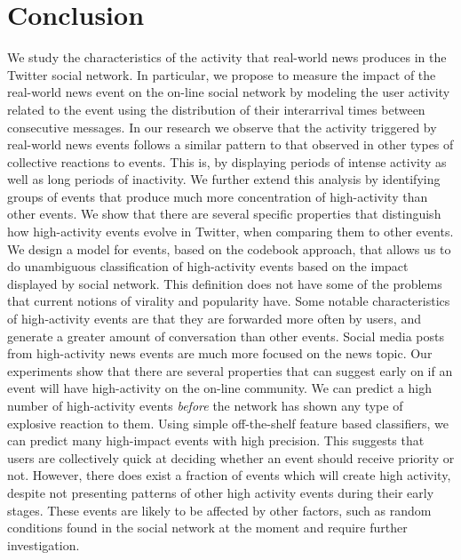 \section{Conclusion}

We study the characteristics of the activity that real-world news produces in
the Twitter social network. 
%
In particular, we propose to measure the impact of the real-world news event on
the on-line social network by modeling the user activity related to the event
using the distribution of their interarrival times between consecutive messages.
%
In our research we observe that the activity triggered by real-world news events
follows a similar pattern to that observed in other types of collective
reactions to events. 
%
This is, by displaying periods of intense activity as well as long periods of
inactivity.
%
We further extend this analysis by identifying groups of events that produce
much more concentration of high-activity than other events. 
%
We show that there are several specific properties that distinguish how
high-activity events evolve in Twitter, when comparing them to other events. 
%
We design a model for events, based on the codebook approach, that allows us to
do unambiguous classification of high-activity events based on the impact
displayed by social network. 
%
This definition does not have some of the problems that current notions of
virality and popularity have. 
%
Some notable characteristics of high-activity events are that they are forwarded
more often by users, and generate a greater amount of conversation than other
events.
%
Social media posts from high-activity news events are much more focused on the
news topic. 
%
Our experiments show that there are several properties that can suggest early on
if an event will have high-activity on the on-line community. 
%
We can predict a high number of high-activity events {\em before} the network
has shown any type of explosive reaction to them. 
%
Using simple off-the-shelf feature based classifiers, we can predict many
high-impact events with high precision. 
%
This suggests that users are collectively quick at deciding whether an event
should receive priority or not. 
%
However, there does exist a fraction of events which will create high activity,
despite not presenting patterns of other high activity events during their early
stages.
%
These events are likely to be affected by other factors, such as random
conditions found in the social network at the moment and require further
investigation.
